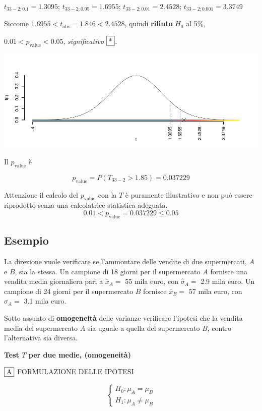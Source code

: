 \documentclass[
  11pt,
]{book}
\theoremstyle{mytheoremstyle}
\theoremstyle{mydefstyle}
\begin{document}
\(t_{33-2;0.1}=1.3095\); \(t_{33-2;0.05}=1.6955\); \(t_{33-2;0.01}=2.4528\); \(t_{33-2;0.001}=3.3749\)

Siccome \(1.6955<t_\text{obs}=1.846<2.4528\), quindi \textbf{rifiuto} \(H_0\) al 5\%,

\(0.01<p_\text{value}<0.05\), \emph{significativo} \(\fbox{*}\).

\begin{center}\includegraphics{Appunti_di_Statistica_2025_files/figure-latex/16-test-2C-1,-1} \end{center}

Il \(p_{\text{value}}\) è

\[ p_{\text{value}} = P(T_{33-2}>1.85)=0.037229 \]

Attenzione il calcolo del \(p_\text{value}\) con la \(T\) è puramente illustrativo e non può essere riprodotto senza una calcolatrice statistica adeguata.\[
 0.01 < p_\text{value}= 0.037229 \leq 0.05 
\]

\subsection{Esempio}\label{esempio-4}

La direzione vuole verificare se l'ammontare delle vendite di due
supermercati, \(A\) e \(B\), sia la stessa. Un campione di 18 giorni per
il supermercato \(A\) fornisce una vendita media giornaliera pari a
\(\bar x_A=\) 55 mila euro, con \(\hat\sigma_A=\) 2.9 mila euro. Un campione di 24
giorni per il supermercato \(B\) fornisce \(\bar x_B=\) 57 mila euro, con
\(\hat\sigma_A=\) 3.1 mila euro.

Sotto assunto di \textbf{omogeneità} delle varianze
verificare l'ipotesi che la vendita media del supermercato \(A\) sia uguale a quella del supermercato \(B\), contro l'alternativa sia diversa.

\textbf{Test \(T\) per due medie, (omogeneità)}

\(\fbox{A}\) FORMULAZIONE DELLE IPOTESI

\[\begin{cases}
   H_0: \mu_\text{$A$} = \mu_\text{$B$} \\
   H_1: \mu_\text{$A$} \neq \mu_\text{$B$} 
   \end{cases}\]
\end{document}
